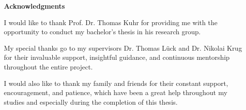 \thispagestyle{plain}

\begin{spacing}{1.2}
  \large

  \begin{center}
    \vspace*{2cm}
    \textbf{\Large Acknowledgments}
    \vspace{1.5cm}
  \end{center}

  \begin{flushleft}
    I would like to thank Prof. Dr. Thomas Kuhr for providing me with the opportunity to conduct my bachelor's thesis in his research group.

    \vspace{\baselineskip}
    My special thanks go to my supervisors Dr. Thomas Lück and Dr. Nikolai Krug for their invaluable support, insightful guidance, and continuous mentorship throughout the entire project.

    \vspace{\baselineskip}
    I would also like to thank my family and friends for their constant support, encouragement, and patience, which have been a great help throughout my studies and especially during the completion of this thesis.
  \end{flushleft}

\end{spacing}
\restoregeometry